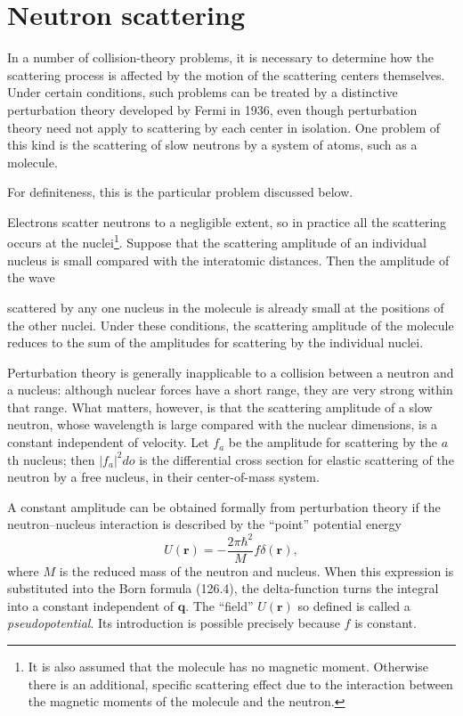 \section{Neutron scattering}

In a number of collision-theory problems, it is necessary to determine how the scattering process is affected by the motion of the scattering centers themselves. Under certain conditions, such problems can be treated by a distinctive perturbation theory developed by Fermi in 1936, even though perturbation theory need not apply to scattering by each center in isolation. One problem of this kind is the scattering of slow neutrons by a system of atoms, such as a molecule.

For definiteness, this is the particular problem discussed below.

Electrons scatter neutrons to a negligible extent, so in practice all the scattering occurs at the nuclei\footnote{It is also assumed that the molecule has no magnetic moment. Otherwise there is an additional, specific scattering effect due to the interaction between the magnetic moments of the molecule and the neutron.}. Suppose that the scattering amplitude of an individual nucleus is small compared with the interatomic distances. Then the amplitude of the wave

scattered by any one nucleus in the molecule is already small at the positions of the other nuclei. Under these conditions, the scattering amplitude of the molecule reduces to the sum of the amplitudes for scattering by the individual nuclei.

Perturbation theory is generally inapplicable to a collision between a neutron and a nucleus: although nuclear forces have a short range, they are very strong within that range. What matters, however, is that the scattering amplitude of a slow neutron, whose wavelength is large compared with the nuclear dimensions, is a constant independent of velocity. Let $f_a$ be the amplitude for scattering by the $a$th nucleus; then $|f_a|^2do$ is the differential cross section for elastic scattering of the neutron by a free nucleus, in their center-of-mass system.

A constant amplitude can be obtained formally from perturbation theory if the neutron--nucleus interaction is described by the ``point'' potential energy
\begin{equation}
 U(\mathbf r)=-\frac{2\pi\hbar^2}{M}f\delta(\mathbf r),
 \tag{151.1}
\end{equation}
where $M$ is the reduced mass of the neutron and nucleus. When this expression is substituted into the Born formula (126.4), the delta-function turns the integral into a constant independent of $\mathbf q$. The ``field'' $U(\mathbf r)$ so defined is called a \emph{pseudopotential}. Its introduction is possible precisely because $f$ is constant.

